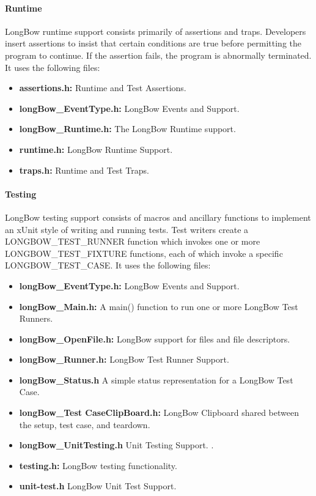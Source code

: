 \paragraph {Runtime}
LongBow runtime support consists primarily of assertions and traps. Developers insert assertions to insist that certain conditions are true before permitting the program to continue. If the assertion fails, the program is abnormally terminated. It uses the following files:

\begin{itemize}
\item {\bf assertions.h:} 	Runtime and Test Assertions.
 \item {\bf longBow\_EventType.h:} LongBow Events and Support. 
 \item {\bf longBow\_Runtime.h:} The LongBow Runtime support. 
 \item {\bf runtime.h:} LongBow Runtime Support. 
 \item {\bf traps.h:} Runtime and Test Traps. 
\end{itemize}


\paragraph {Testing}
LongBow testing support consists of macros and ancillary functions to implement an xUnit style of writing and running tests. Test writers create a LONGBOW\_TEST\_RUNNER function which invokes one or more LONGBOW\_TEST\_FIXTURE functions, each of which invoke a specific LONGBOW\_TEST\_CASE. It uses the following files:

\begin{itemize}
\item {\bf longBow\_EventType.h:} 	LongBow Events and Support. 
 \item {\bf longBow\_Main.h:} A main() function to run one or more LongBow Test Runners. 
 \item {\bf longBow\_OpenFile.h:} LongBow support for files and file descriptors. 
 \item {\bf longBow\_Runner.h:} LongBow Test Runner Support. 
 \item {\bf longBow\_Status.h} A simple status representation for a LongBow Test Case. 
  \item {\bf longBow\_Test CaseClipBoard.h:} LongBow Clipboard shared between the setup, test case, and teardown. 
 \item {\bf longBow\_UnitTesting.h} Unit Testing Support. . 
 \item {\bf testing.h:} LongBow testing functionality. 
 \item {\bf unit-test.h} LongBow Unit Test Support. 
\end{itemize}

